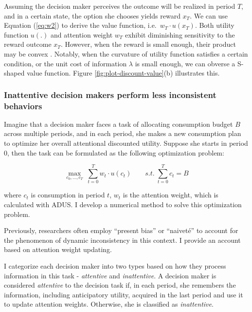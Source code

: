 \documentclass[
  12pt,
]{article}
\begin{document}
Assuming the decision maker perceives the outcome will be realized in
period \(T\), and in a certain state, the option she chooses yields
reward \(x_T\). We can use Equation (\ref{eq:w2}) to derive the value
function, i.e.~\(w_T\cdot u(x_T)\). Both utility function \(u(.)\) and
attention weight \(w_T\) exhibit diminishing sensitivity to the reward
outcome \(x_T\). However, when the reward is small enough, their product
may be convex . Notably, when the curvature of utility function
satisfies a certain condition, or the unit cost of information
\(\lambda\) is small enough, we can obverse a S-shaped value function.
Figure \ref{fig:plot-discount-value}(b) illustrates this.

\hypertarget{inattentive-decision-makers-perform-less-inconsistent-behaviors}{%
\subsubsection{Inattentive decision makers perform less inconsistent
behaviors}\label{inattentive-decision-makers-perform-less-inconsistent-behaviors}}

Imagine that a decision maker faces a task of allocating consumption
budget \(B\) across multiple periods, and in each period, she makes a
new consumption plan to optimize her overall attentional discounted
utility. Suppose she starts in period 0, then the task can be formulated
as the following optimization problem:

\[
\max_{c_0,...,c_T}\;\sum_{t=0}^T w_t\cdot u(c_t) \qquad s.t.\;\sum_{t=0}^T c_t=B  
\]

where \(c_t\) is consumption in period \(t\), \(w_t\) is the attention
weight, which is calculated with ADUS. I develop a numerical method to
solve this optimization problem.

Previously, researchers often employ ``present bias''
\citep{laibson_golden_1997} or ``naiveté'' \citep{odonoghue_doing_1999}
to account for the phenomenon of dynamic inconsistency in this context.
I provide an account based on attention weight updating.

I categorize each decision maker into two types based on how they
process information in this task - \emph{attentive} and
\emph{inattentive}. A decision maker is considered \emph{attentive} to
the decision task if, in each period, she remembers the information,
including anticipatory utility, acquired in the last period and use it
to update attention weights. Otherwise, she is classified as
\emph{inattentive}.
\end{document}
